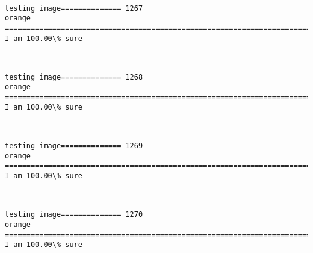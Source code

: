 \documentclass[11pt]{article}
\begin{document}
    \begin{center}
    \end{center}
    { \hspace*{\fill} \\}
    
    \begin{Verbatim}[commandchars=\\\{\}]
testing image============== 1267
orange
============================================================================
I am 100.00\% sure

    \end{Verbatim}

    \begin{center}
    \end{center}
    { \hspace*{\fill} \\}
    
    \begin{Verbatim}[commandchars=\\\{\}]
testing image============== 1268
orange
============================================================================
I am 100.00\% sure

    \end{Verbatim}

    \begin{center}
    \end{center}
    { \hspace*{\fill} \\}
    
    \begin{Verbatim}[commandchars=\\\{\}]
testing image============== 1269
orange
============================================================================
I am 100.00\% sure

    \end{Verbatim}

    \begin{center}
    \end{center}
    { \hspace*{\fill} \\}
    
    \begin{Verbatim}[commandchars=\\\{\}]
testing image============== 1270
orange
============================================================================
I am 100.00\% sure

    \end{Verbatim}
\end{document}
